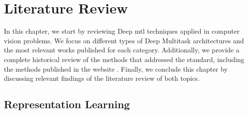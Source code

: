 \section{Literature Review} \label{sec:literature}

In this chapter, we start by reviewing Deep \acl{mtl} techniques applied in computer vision problems. We focus on different types of Deep Multitask architectures and the most relevant works published for each category. Additionally, we provide a complete historical review of the methods that addressed the \icao standard, including the methods published in the \fvcongoing website \citep{fvcongoing}. Finally, we conclude this chapter by discussing relevant findings of the literature review of both topics.

\subsection{Representation Learning}



